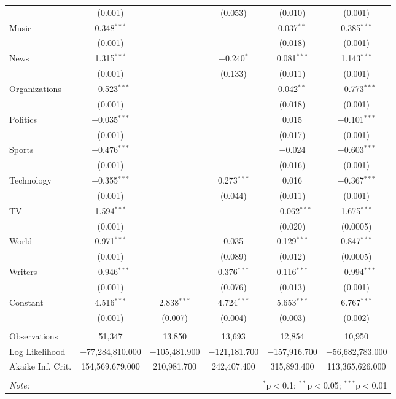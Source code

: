 \begin{table}[!htbp]
\begin{tabular}{@{\extracolsep{5pt}}lccccc}
  & (0.001) &  & (0.053) & (0.010) & (0.001) \\ 
  Music & 0.348$^{***}$ &  &  & 0.037$^{**}$ & 0.385$^{***}$ \\ 
  & (0.001) &  &  & (0.018) & (0.001) \\ 
  News & 1.315$^{***}$ &  & $-$0.240$^{*}$ & 0.081$^{***}$ & 1.143$^{***}$ \\ 
  & (0.001) &  & (0.133) & (0.011) & (0.001) \\ 
  Organizations & $-$0.523$^{***}$ &  &  & 0.042$^{**}$ & $-$0.773$^{***}$ \\ 
  & (0.001) &  &  & (0.018) & (0.001) \\ 
  Politics & $-$0.035$^{***}$ &  &  & 0.015 & $-$0.101$^{***}$ \\ 
  & (0.001) &  &  & (0.017) & (0.001) \\ 
  Sports & $-$0.476$^{***}$ &  &  & $-$0.024 & $-$0.603$^{***}$ \\ 
  & (0.001) &  &  & (0.016) & (0.001) \\ 
  Technology & $-$0.355$^{***}$ &  & 0.273$^{***}$ & 0.016 & $-$0.367$^{***}$ \\ 
  & (0.001) &  & (0.044) & (0.011) & (0.001) \\ 
  TV & 1.594$^{***}$ &  &  & $-$0.062$^{***}$ & 1.675$^{***}$ \\ 
  & (0.001) &  &  & (0.020) & (0.0005) \\ 
  World & 0.971$^{***}$ &  & 0.035 & 0.129$^{***}$ & 0.847$^{***}$ \\ 
  & (0.001) &  & (0.089) & (0.012) & (0.0005) \\ 
  Writers & $-$0.946$^{***}$ &  & 0.376$^{***}$ & 0.116$^{***}$ & $-$0.994$^{***}$ \\ 
  & (0.001) &  & (0.076) & (0.013) & (0.001) \\ 
  Constant & 4.516$^{***}$ & 2.838$^{***}$ & 4.724$^{***}$ & 5.653$^{***}$ & 6.767$^{***}$ \\ 
  & (0.001) & (0.007) & (0.004) & (0.003) & (0.002) \\ 
 \hline \\[-1.8ex] 
Observations & 51,347 & 13,850 & 13,693 & 12,854 & 10,950 \\ 
Log Likelihood & $-$77,284,810.000 & $-$105,481.900 & $-$121,181.700 & $-$157,916.700 & $-$56,682,783.000 \\ 
Akaike Inf. Crit. & 154,569,679.000 & 210,981.700 & 242,407.400 & 315,893.400 & 113,365,626.000 \\ 
\hline 
\hline \\[-1.8ex] 
\textit{Note:}  & \multicolumn{5}{r}{$^{*}$p$<$0.1; $^{**}$p$<$0.05; $^{***}$p$<$0.01} \\ 
\end{tabular} 
\end{table} 
